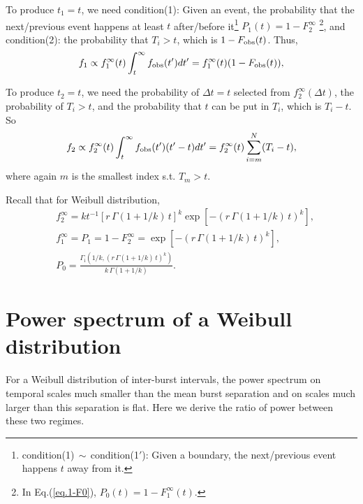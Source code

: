 \documentclass[fleqn,usenatbib]{mnras}
\newcommand{\new}[1]{#1}
\begin{document}
To produce $t_1=t$, we need 
condition(1): Given an event, the probability that the next/previous event happens at least $t$ after/before it\footnote{condition(1)$\,\sim\,$condition(1$'$): Given a boundary, the next/previous event happens $t$ away from it.} $P_1(t)=1-F^\infty_2$ \footnote{In Eq.(\ref{eq.1-F0}), $P_0(t)=1-F^\infty_1(t)$.}, and condition(2): the probability that $T_i>t$, which is $1-F_{\rm obs}(t)$. Thus,
\begin{equation}
	f_1\propto f^\infty_1(t)\int_t^\infty f_{\rm obs}(t')dt' = f^\infty_1(t) (1-F_{\rm obs}(t)),
\end{equation}

To produce $t_2=t$, we need the probability of $\Delta t=t$ selected from $f^\infty_2(\Delta t)$, the probability of $T_i>t$, and the probability that $t$ can be put in $T_i$, which is $T_i-t$. So
\begin{equation}
	f_2\propto f^\infty_2(t)\int_t^\infty f_{\rm obs}(t')(t'-t)dt'=f^\infty_2(t)\sum_{i=m}^{N}(T_i-t),
\end{equation}
where again $m$ is the smallest index s.t. $T_m>t$.

Recall that for Weibull distribution,
\begin{align}
	& f^\infty_2=kt^{-1}[r\,\Gamma(1+1/k)\,t]^k \exp\left[-(r\,\Gamma(1+1/k)\,t)^k\right],\\
	& f^\infty_1 = P_1 = 1-F^\infty_2 = \exp\left[-(r\,\Gamma(1+1/k)\,t)^k\right],\\
	& P_0= \frac{\Gamma_\mathrm{i}{\left(1/k, \left(r\,\Gamma(1+1/k)\,t\right)^k\right)}}{k\,\Gamma{\left(1+1/k\right)}}.
\end{align}



\section{Power spectrum of a Weibull distribution}
\label{app:power}


\new{For a Weibull distribution of inter-burst intervals, the power spectrum on temporal scales much smaller than the mean burst separation and on scales much larger than this separation is flat. Here we derive the ratio of power between these two regimes.}
\end{document}
